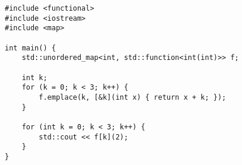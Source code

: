 \begin{lstlisting}[title=\href{https://godbolt.org/z/iquoDN}{\texttt{godbolt.org/z/iquoDN}}]
#include <functional>
#include <iostream>
#include <map>

int main() {
    std::unordered_map<int, std::function<int(int)>> f;
    
    int k;
    for (k = 0; k < 3; k++) {
        f.emplace(k, [&k](int x) { return x + k; });
    }

    for (int k = 0; k < 3; k++) {
        std::cout << f[k](2);
    }
}
\end{lstlisting}
